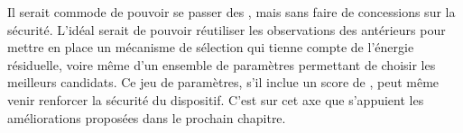Il serait commode de pouvoir se passer des \vns, mais sans faire de concessions sur la sécurité.
L'idéal serait de pouvoir réutiliser les observations des \cns antérieurs pour mettre en place un mécanisme de sélection qui tienne compte de l'énergie résiduelle, voire même d'un ensemble de paramètres permettant de choisir les meilleurs candidats.
Ce jeu de paramètres, s'il inclue un score de , peut même venir renforcer la sécurité du dispositif.
C'est sur cet axe que s'appuient les améliorations proposées dans le prochain chapitre.
